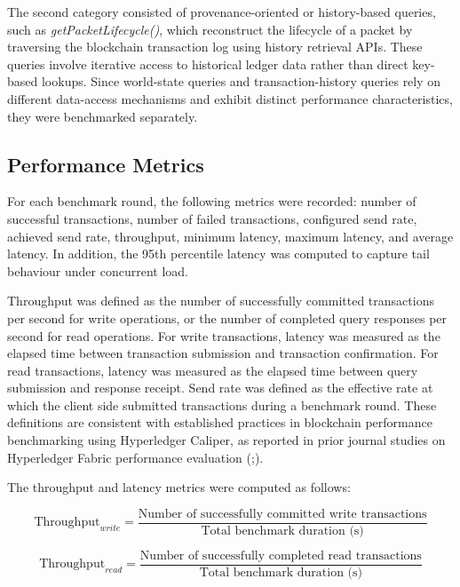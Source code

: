 \documentclass[12pt]{article}
\begin{document}
	The second category consisted of provenance-oriented or history-based queries, such as \textit{getPacketLifecycle()}, which reconstruct the lifecycle of a packet by traversing the blockchain transaction log using history retrieval APIs. These queries involve iterative access to historical ledger data rather than direct key-based lookups. Since world-state queries and transaction-history queries rely on different data-access mechanisms and exhibit distinct performance characteristics, they were benchmarked separately.
	
	\subsection{Performance Metrics}
	
	For each benchmark round, the following metrics were recorded: number of successful transactions, number of failed transactions, configured send rate, achieved send rate, throughput, minimum latency, maximum latency, and average latency. In addition, the 95th percentile latency was computed to capture tail behaviour under concurrent load.
	
	Throughput was defined as the number of successfully committed transactions per second for write operations, or the number of completed query responses per second for read operations. For write transactions, latency was measured as the elapsed time between transaction submission and transaction confirmation. For read transactions, latency was measured as the elapsed time between query submission and response receipt. Send rate was defined as the effective rate at which the client side submitted transactions during a benchmark round. These definitions are consistent with established practices in blockchain performance benchmarking using Hyperledger Caliper, as reported in prior journal studies on Hyperledger Fabric performance evaluation (\cite{kaushal_convergence_2025};\cite{kumar_integrating_2026}).
	
	The throughput and latency metrics were computed as follows:
	
	\begin{equation}
		\text{Throughput}_{write} = \frac{\text{Number of successfully committed write transactions}}{\text{Total benchmark duration (s)}}
	\end{equation}
	
	\begin{equation}
		\text{Throughput}_{read} = \frac{\text{Number of successfully completed read transactions}}{\text{Total benchmark duration (s)}}
	\end{equation}
	
\end{document}
